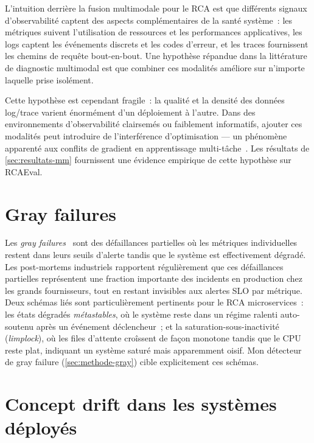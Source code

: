 \documentclass[a4paper,11pt,oneside]{report}
\begin{document}
L'intuition derri\`ere la fusion multimodale pour le RCA est que diff\'erents signaux d'observabilit\'e captent des aspects compl\'ementaires de la sant\'e syst\`eme~: les m\'etriques suivent l'utilisation de ressources et les performances applicatives, les logs captent les \'ev\'enements discrets et les codes d'erreur, et les traces fournissent les chemins de requ\^ete bout-en-bout. Une hypoth\`ese r\'epandue dans la litt\'erature de diagnostic multimodal est que combiner ces modalit\'es am\'eliore sur n'importe laquelle prise isol\'ement.

Cette hypoth\`ese est cependant fragile~: la qualit\'e et la densit\'e des donn\'ees log/trace varient \'enorm\'ement d'un d\'eploiement \`a l'autre. Dans des environnements d'observabilit\'e clairsem\'es ou faiblement informatifs, ajouter ces modalit\'es peut introduire de l'interf\'erence d'optimisation --- un ph\'enom\`ene apparent\'e aux conflits de gradient en apprentissage multi-t\^ache~\cite{yu2020gradsurgery}. Les r\'esultats de \cref{sec:resultats-mm} fournissent une \'evidence empirique de cette hypoth\`ese sur RCAEval.

\section{Gray failures}
\label{sec:eda-gray}

Les \emph{gray failures}~\cite{huang2017grayfailure} sont des d\'efaillances partielles o\`u les m\'etriques individuelles restent dans leurs seuils d'alerte tandis que le syst\`eme est effectivement d\'egrad\'e. Les post-mortems industriels rapportent r\'eguli\`erement que ces d\'efaillances partielles repr\'esentent une fraction importante des incidents en production chez les grands fournisseurs, tout en restant invisibles aux alertes SLO par m\'etrique. Deux sch\'emas li\'es sont particuli\`erement pertinents pour le RCA microservices~: les \'etats d\'egrad\'es \emph{m\'etastables}, o\`u le syst\`eme reste dans un r\'egime ralenti auto-soutenu apr\`es un \'ev\'enement d\'eclencheur~; et la saturation-sous-inactivit\'e (\emph{limplock}), o\`u les files d'attente cro\^issent de fa\c{c}on monotone tandis que le CPU reste plat, indiquant un syst\`eme satur\'e mais apparemment oisif. Mon d\'etecteur de gray failure (\cref{sec:methode-gray}) cible explicitement ces sch\'emas.

\section{Concept drift dans les syst\`emes d\'eploy\'es}
\label{sec:eda-drift}
\end{document}
